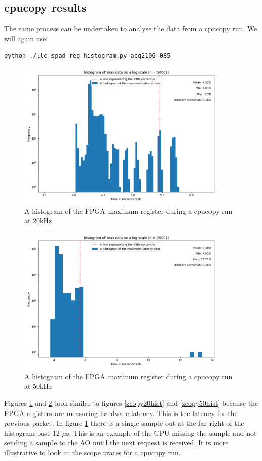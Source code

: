 \documentclass{article}
\begin{document}
\subsection{cpucopy results}
The same process can be undertaken to analyse the data from a cpucopy run. We will again use:

\begin{verbatim}
python ./llc_spad_reg_histogram.py acq2106_085
\end{verbatim}

\begin{figure}
	\centering
	\includegraphics[width=4.0in]{images/better_images/20k_cpu.png}
	\caption{A histogram of the FPGA maximum register during a cpucopy run at 20kHz}
	\label{cpu20hist}
\end{figure}

\begin{figure}
	\centering
	\includegraphics[width=4.0in]{images/better_images/50kHz_cpu.png}
	\caption{A histogram of the FPGA maximum register during a cpucopy run at 50kHz}
	\label{cpu50hist}
\end{figure}

Figures \ref{cpu20hist} and \ref{cpu50hist} look similar to figures \ref{zcopy20hist} and \ref{zcopy50hist} because the FPGA registers are measuring hardware latency.
This is the latency for the previous packet.
In figure \ref{cpu20hist} there is a single sample out at the far right of the histogram past 12 $\mu$s.
This is an example of the CPU missing the sample and not sending a sample to the AO until the next request is received.
It is more illustrative to look at the scope traces for a cpucopy run.
\end{document}
